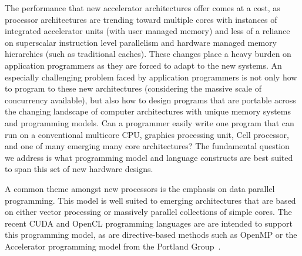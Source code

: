 

The performance that new accelerator architectures offer comes at a
cost, as processor architectures are trending toward multiple cores
with instances of integrated accelerator units (with user managed
memory) and less of a reliance on superscalar instruction level
parallelism and hardware managed memory hierarchies (such as
traditional caches).  These changes place a heavy burden on
application programmers as they are forced to adapt to the new
systems.  An especially challenging problem faced by application
programmers is not only how to program to these new architectures
(considering the massive scale of concurrency available), but also how
to design programs that are portable across the changing landscape of
computer architectures with unique memory systems and programming
models.  Can a programmer easily write one program that can run on a
conventional multicore CPU, graphics processing unit, Cell processor,
and one of many emerging many core architectures?  The fundamental
question we address is what programming model and language constructs
are best suited to span this set of new hardware designs.


A common theme amongst new processors is the emphasis on data parallel
programming.  This model is well suited to emerging architectures that
are based on either vector processing or massively parallel
collections of simple cores.  The recent CUDA and OpenCL programming
languages are are intended to support this programming model, as are
directive-based methods such as OpenMP or the Accelerator programming
model from the Portland Group~\cite{pgi10accelerator}.

